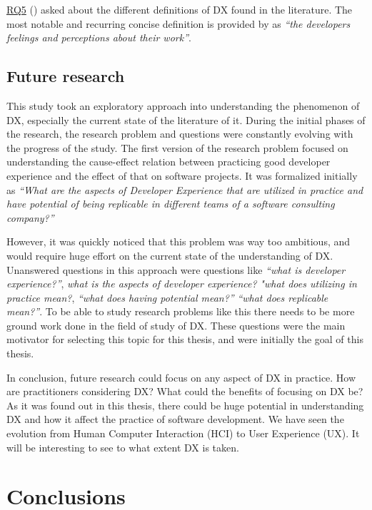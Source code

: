 \documentclass[english, 12pt, a4paper, sci, utf8, a-1b, online]{aaltothesis}
\begin{document}
\hyperref[RQ5]{RQ5} (\rqfive) asked about the different definitions of DX found in the literature. The most notable and recurring concise definition is provided by \textcite{fagerholm-dx-concept-and-definition} as \textit{``the developers feelings and perceptions about their work''}.

\subsection{Future research}

This study took an exploratory approach into understanding the phenomenon of DX, especially the current state of the literature of it. During the initial phases of the research, the research problem and questions were constantly evolving with the progress of the study. The first version of the research problem focused on understanding the cause-effect relation between practicing good developer experience and the effect of that on software projects. It was formalized initially as \textit{``What are the aspects of Developer Experience that are utilized in practice and have potential of being replicable in different teams of a software consulting company?''}

However, it was quickly noticed that this problem was way too ambitious, and would require huge effort on the current state of the understanding of DX. Unanswered questions in this approach were questions like \textit{``what is developer experience?''}, \textit{what is the aspects of developer experience?} \textit{"what does utilizing in practice mean?}, \textit{``what does having potential mean?''} \textit{``what does replicable mean?''}. To be able to study research problems like this there needs to be more ground work done in the field of study of DX. These questions were the main motivator for selecting this topic for this thesis, and were initially the goal of this thesis.

In conclusion, future research could focus on any aspect of DX in practice. How are practitioners considering DX? What could the benefits of focusing on DX be? As it was found out in this thesis, there could be huge potential in understanding DX and how it affect the practice of software development. We have seen the evolution from Human Computer Interaction (HCI) to User Experience (UX). It will be interesting to see to what extent DX is taken.

\clearpage
\section{Conclusions} \label{section:conclusions}
\end{document}
